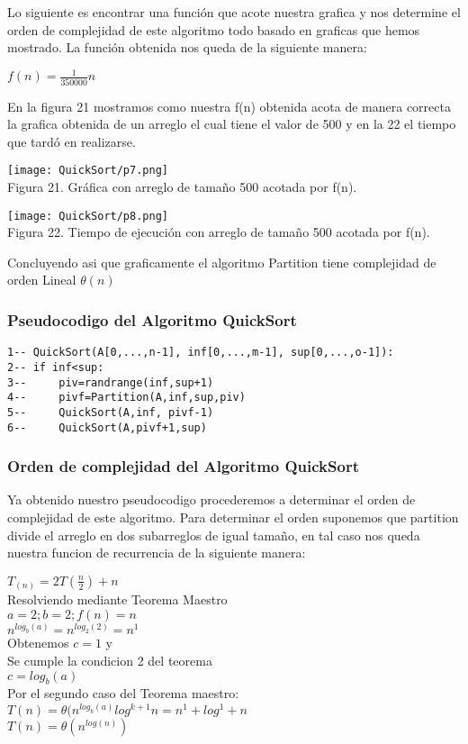 \documentclass[12pt,twoside]{article}
\begin{document}
Lo siguiente es encontrar una funci\'on que acote nuestra grafica y nos determine el orden de complejidad de este algoritmo todo basado en graficas que hemos mostrado. La funci\'on obtenida nos queda de la siguiente manera:
\begin{center}
    $f(n) = \frac{1}{350000}n$
\end{center}
En la figura 21 mostramos como nuestra f(n) obtenida acota de manera correcta la grafica obtenida de un arreglo el cual tiene el valor de 500 y en la 22 el tiempo que tard\'o en realizarse.
\begin{center}
    \texttt{[image: QuickSort/p7.png]}\\
    Figura 21. Gr\'afica con arreglo de tamaño 500 acotada por f(n).
\end{center}
\begin{center}
    \texttt{[image: QuickSort/p8.png]}\\
    Figura 22. Tiempo de ejecuci\'on con arreglo de tamaño 500 acotada por f(n).
\end{center}
Concluyendo asi que graficamente el algoritmo Partition tiene complejidad de orden Lineal $\theta{(n)}$
\subsubsection{Pseudocodigo del Algoritmo QuickSort}
\begin{lstlisting}
1-- QuickSort(A[0,...,n-1], inf[0,...,m-1], sup[0,...,o-1]):
2--	if inf<sup:
3--		piv=randrange(inf,sup+1)
4--		pivf=Partition(A,inf,sup,piv)
5--		QuickSort(A,inf, pivf-1)
6--		QuickSort(A,pivf+1,sup)
\end{lstlisting}
\subsubsection{Orden de complejidad del Algoritmo QuickSort}
Ya obtenido nuestro pseudocodigo procederemos a determinar el orden de complejidad de este algoritmo. Para determinar el orden suponemos que partition divide el arreglo en dos subarreglos de igual tamaño, en tal caso nos queda nuestra funcion de recurrencia de la siguiente manera:

$T_{(n)}=2T(\frac{n}{2})+{n}$\\
Resolviendo mediante Teorema Maestro \\
$a=2; b=2; f(n)= n$\\
$n^{log_b(a)} = n^{log_2(2)} = n^{1}$\\
Obtenemos $c=1$ y \\
Se cumple la condicion 2 del teorema\\
$c= {log_b(a)}$\\
Por el segundo caso del Teorema maestro:\\
$T(n)= \theta(n^{log_b(a)} log^{k+1} n  = n^1 + log^1 + n$\\
$T(n)= \theta(n^{log(n)})$
\end{document}

